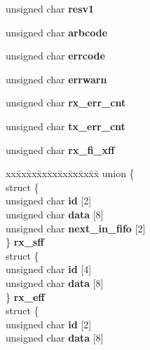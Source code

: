 \begin{DoxyCompactItemize}
unsigned char {\bfseries resv1}
\item 
\mbox{\label{structpelican8__regs_acf6b698d32ecd4a42ecabb88e544edbf}} 
unsigned char {\bfseries arbcode}
\item 
\mbox{\label{structpelican8__regs_ad6e2b09d667237d8d2aa5c99de76b835}} 
unsigned char {\bfseries errcode}
\item 
\mbox{\label{structpelican8__regs_a7a444a009e8b95cb5a4b4f5248be5a8b}} 
unsigned char {\bfseries errwarn}
\item 
\mbox{\label{structpelican8__regs_a0e6c9eb23358e1ba85880a66e59745f9}} 
unsigned char {\bfseries rx\+\_\+err\+\_\+cnt}
\item 
\mbox{\label{structpelican8__regs_a750a342dca34d8556a10361d18d1ac90}} 
unsigned char {\bfseries tx\+\_\+err\+\_\+cnt}
\item 
\mbox{\label{structpelican8__regs_a72785e2281536ba38333c330a0cb533c}} 
unsigned char {\bfseries rx\+\_\+fi\+\_\+xff}
\item 
\mbox{\label{structpelican8__regs_ae006104ea1d6bf0d2fd240908625d7c8}} 
\begin{tabbing}
xx\=xx\=xx\=xx\=xx\=xx\=xx\=xx\=xx\=\kill
union \{\\
\>struct \{\\
\>\>unsigned char {\bfseries id} \mbox{[}2\mbox{]}\\
\>\>unsigned char {\bfseries data} \mbox{[}8\mbox{]}\\
\>\>unsigned char {\bfseries next\_in\_fifo} \mbox{[}2\mbox{]}\\
\>\} {\bfseries rx\_sff}\\
\>struct \{\\
\>\>unsigned char {\bfseries id} \mbox{[}4\mbox{]}\\
\>\>unsigned char {\bfseries data} \mbox{[}8\mbox{]}\\
\>\} {\bfseries rx\_eff}\\
\>struct \{\\
\>\>unsigned char {\bfseries id} \mbox{[}2\mbox{]}\\
\>\>unsigned char {\bfseries data} \mbox{[}8\mbox{]}\\

\end{tabbing}
\end{DoxyCompactItemize}
